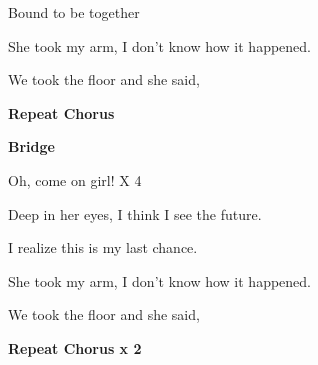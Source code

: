  Bound to be together

She  took my  arm, I don't know  how it  happened.

We  took the  floor and she  said,

\textbf{Repeat Chorus}

\textbf{Bridge}

 Oh, come on girl!      X 4

 Deep in her  eyes, I think I  see the  future.

I  realize  this is my last  chance.

She  took my  arm, I don't know  how it  happened.

We  took the  floor and she  said,

\textbf{Repeat Chorus x 2}

